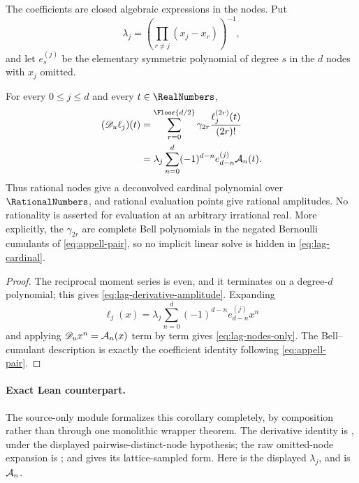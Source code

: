The coefficients are closed algebraic expressions in the nodes.  Put
\[
 \lambda_j=\left(\prod_{r\ne j}(x_j-x_r)\right)^{-1},
\]
and let $e_s^{(j)}$ be the elementary symmetric polynomial of degree $s$ in
the $d$ nodes with $x_j$ omitted.

\begin{corollary}
\label{cor:lag-nodes-only}
For every $0\le j\le d$ and every $t\in\RealNumbers$,
\begin{align}
 (\mathscr D_u\ell_j)(t)
 &=\sum_{r=0}^{\Floor{d/2}}
   \gamma_{2r}\frac{\ell_j^{(2r)}(t)}{(2r)!}
 \label{eq:lag-derivative-amplitude}\\
 &=\lambda_j\sum_{n=0}^{d}(-1)^{d-n}e_{d-n}^{(j)}\Gd_n(t).
 \label{eq:lag-nodes-only}
\end{align}
Thus rational nodes give a deconvolved cardinal polynomial over
$\RationalNumbers$, and rational evaluation points give rational amplitudes.
No rationality is asserted for evaluation at an arbitrary irrational real.
More explicitly, the $\gamma_{2r}$ are complete Bell polynomials in the
negated Bernoulli cumulants of \eqref{eq:appell-pair}, so no implicit linear
solve is hidden in \eqref{eq:lag-cardinal}.
\end{corollary}

\begin{proof}
The reciprocal moment series is even, and it terminates on a degree-$d$
polynomial; this gives \eqref{eq:lag-derivative-amplitude}.  Expanding
\[
 \ell_j(x)=\lambda_j\sum_{n=0}^{d}
 (-1)^{d-n}e_{d-n}^{(j)}x^n
\]
and applying $\mathscr D_ux^n=\mathcal A_n(x)$ term by term gives
\eqref{eq:lag-nodes-only}.  The Bell--cumulant description is exactly the
coefficient identity following \eqref{eq:appell-pair}.
\end{proof}

\paragraph{Exact Lean counterpart.}
The source-only module 
formalizes this corollary completely, by composition rather than through one
monolithic wrapper theorem.  The derivative identity is
,
under the displayed pairwise-distinct-node hypothesis; the raw omitted-node
expansion is
;
and  gives its
lattice-sampled form.  Here  is the displayed
$\lambda_j$, and  is $\mathcal A_n$.

